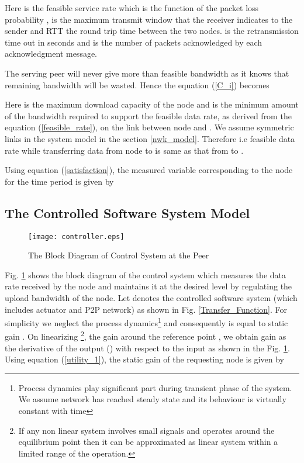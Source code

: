 \documentclass[journal]{IEEEtran}
\begin{document}
Here  is the feasible service rate which is the function of the packet loss probability ,  is the maximum transmit window that the receiver indicates to the sender and RTT the round trip time between the two nodes.  is the retransmission time out in seconds and  is the number of packets acknowledged by each acknowledgment message.  

The serving peer will never give more than feasible bandwidth as it knows  that remaining bandwidth will be wasted.  Hence the equation (\ref{C_i}) becomes 

Here  is the maximum download capacity of the node  and  is the minimum amount of the bandwidth required to support the feasible data rate, as derived from the equation (\ref{feasible_rate}), on the link between node  and . We assume symmetric links in the system model in the  section \ref{nwk_model}. Therefore  i.e feasible data rate while transferring data from node  to  is same as that from  to .

Using equation (\ref{satisfaction}), the measured variable  corresponding to the node  for the  time period is given by

\subsection{The Controlled Software System Model}
\label{The Controlled Software System Model}
\begin{figure}
	\centering
	\texttt{[image: controller.eps]}
	\caption{The Block Diagram of Control System at the Peer}
\label{control block}
\end{figure}  
Fig. \ref{control block} shows the block diagram of the control system which measures the data rate received by the node and maintains it at the desired level by regulating the upload bandwidth of the node. Let  denotes the controlled software system (which includes actuator and P2P network) as shown in Fig. \ref{Transfer_Function}. For simplicity we neglect the process dynamics\footnote{Process dynamics play significant part during transient phase of the system. We assume network has reached steady state and its behaviour is virtually constant with time} and consequently  is equal to static gain . On linearizing \footnote{If any non linear system involves small signals and operates around the equilibrium point then it can be approximated as linear system within a limited range of the operation.}, the gain  \cite{Ogata} around the reference point , we obtain gain as the  derivative of the output () with respect to the input  as shown in the Fig. \ref{control block}. Using equation (\ref{utility_1}), the static gain of the requesting node  is given by 
\end{document}
